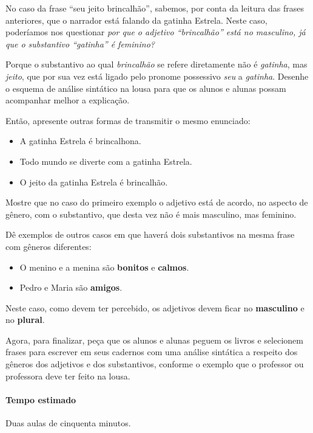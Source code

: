 \documentclass[11pt]{extarticle}
\begin{document}

No caso da frase ``seu jeito brincalhão'', sabemos, por conta da leitura das frases anteriores,
que o narrador está falando da gatinha Estrela. Neste caso, poderíamos
nos questionar \textit{por que o adjetivo ``brincalhão'' está no masculino,
já que o substantivo ``gatinha'' é feminino?}

Porque o substantivo ao qual \textit{brincalhão} se refere diretamente não é \textit{gatinha},
mas \textit{jeito}, que por sua vez está ligado pelo pronome possessivo \textit{seu} 
a \textit{gatinha}. Desenhe o esquema de análise sintático na lousa para que os alunos
e alunas possam acompanhar melhor a explicação.

Então, apresente outras formas de transmitir o mesmo enunciado:

\begin{itemize}
	\item A gatinha Estrela é brincalhona.
	\item Todo mundo se diverte com a gatinha Estrela. 
	\item O jeito da gatinha Estrela é brincalhão.
\end{itemize}

Mostre que no caso do primeiro exemplo o adjetivo está de acordo, no aspecto de gênero,
com o substantivo, que desta vez não é mais masculino, mas feminino. 

Dê exemplos de outros casos em que haverá dois substantivos na mesma frase com gêneros diferentes:

\begin{itemize}
	\item O menino e a menina são \textbf{bonitos} e \textbf{calmos}.
	\item Pedro e Maria são \textbf{amigos}.
\end{itemize}

Neste caso, como devem ter percebido, os adjetivos devem ficar no \textbf{masculino} e no \textbf{plural}.

Agora, para finalizar, peça que os alunos e alunas peguem os livros e selecionem
frases para escrever em seus cadernos com uma análise sintática a respeito 
dos gêneros dos adjetivos e dos substantivos, conforme o exemplo que o professor
ou professora deve ter feito na lousa. 

\paragraph{Tempo estimado} Duas aulas de cinquenta minutos.
\end{document}
